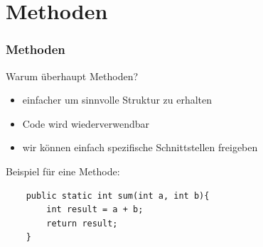 \section{Methoden}

\begin{frame}[fragile] %
\frametitle{Methoden}
Warum überhaupt Methoden?
\begin{itemize}
    \item einfacher um sinnvolle Struktur zu erhalten
    \item Code wird wiederverwendbar
    \item wir können einfach spezifische Schnittstellen freigeben
\end{itemize}
Beispiel für eine Methode:
\begin{lstlisting}
    public static int sum(int a, int b){
        int result = a + b;
        return result;
    }
\end{lstlisting}
\end{frame}


